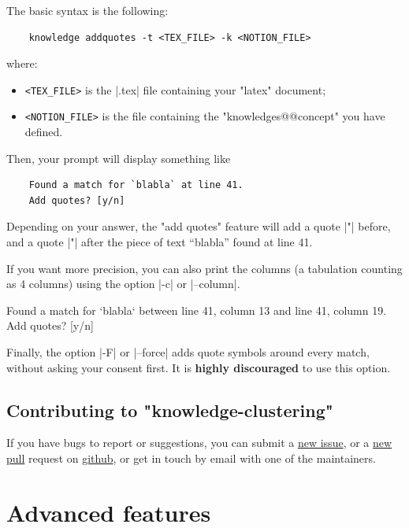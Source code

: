 \documentclass{article}
\begin{document}
The basic syntax is the following:
\begin{verbatim}
    knowledge addquotes -t <TEX_FILE> -k <NOTION_FILE> 
\end{verbatim}
where:
\begin{itemize}
    \item \texttt{<TEX\_FILE>} is the \spverb|.tex| file containing your "latex"
    document;
    \item \texttt{<NOTION\_FILE>} is the file containing the
    "knowledges@@concept" you have defined.
\end{itemize}
Then, your prompt will display something like
\begin{verbatim}
    Found a match for `blabla` at line 41.
    Add quotes? [y/n]
\end{verbatim}
Depending on your answer, the "add quotes" feature will add a quote
%
\spverb|"| before, and a quote \spverb|"| after 
%
the piece of text ``blabla'' found at line 41.

If you want more precision,
you can also print the columns (a tabulation counting as 4 columns)
using the option \spverb|-c| or \spverb|--column|.
\begin{spverbatim}
    Found a match for `blabla` between line 41, column 13 and line 41, column 19.
    Add quotes? [y/n]
\end{spverbatim}

Finally, the option \spverb|-F| or \spverb|--force| adds
quote symbols around every match, without asking your consent first.
It is \textbf{highly discouraged} to use this option. 

\subsection{Contributing to "knowledge-clustering"}

If you have bugs to report or suggestions, you can submit a
\href{https://github.com/remimorvan/knowledge-clustering/issues}{new issue},
or a \href{https://github.com/remimorvan/knowledge-examples/pulls}{new pull} 
request on \href{https://github.com/remimorvan/knowledge-examples}{github}, or get in touch by email with
one of the maintainers.


\section{Advanced features}
\label{sec:advanced-features}
\end{document}
